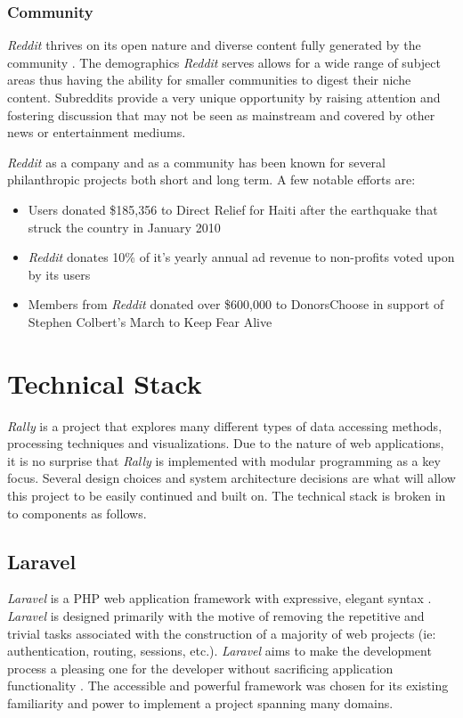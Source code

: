 \documentclass[msc,oneside]{ubcthesis}%
\begin{document}
\subsection{Community}
\textit{Reddit} thrives on its open nature and diverse content fully generated by the community \citep{Atlantic}. The demographics \textit{Reddit} serves allows for a wide range of subject areas thus having the ability for smaller communities to digest their niche content. Subreddits provide a very unique opportunity by raising attention and fostering discussion that may not be seen as mainstream and covered by other news or entertainment mediums.
\par{}
\textit{Reddit} as a company and as a community has been known for several philanthropic projects both short and long term. A few notable efforts are:
\begin{itemize}
\item{Users donated \$185,356 to Direct Relief for Haiti after the earthquake that struck the country in January 2010}
\item{\textit{Reddit} donates 10\% of it's yearly annual ad revenue to non-profits voted upon by its users \citep{RedditBlog}}
\item{Members from \textit{Reddit} donated over \$600,000 to DonorsChoose in support of Stephen Colbert's March to Keep Fear Alive \citep{DonorsChoose}}
\end{itemize}

\chapter{Technical Stack}
\textit{Rally} is a project that explores many different types of data accessing methods, processing techniques and visualizations. Due to the nature of web applications, it is no surprise that \textit{Rally} is implemented with modular programming as a key focus. Several design choices and system architecture decisions are what will allow this project to be easily continued and built on. The technical stack is broken in to components as follows.

\section{Laravel}
\textit{Laravel} is a PHP web application framework with expressive, elegant syntax \citep{Laravel}. \textit{Laravel} is designed primarily with the motive of removing the repetitive and trivial tasks associated with the construction of a majority of web projects (ie: authentication, routing, sessions, etc.). \textit{Laravel} aims to make the development process a pleasing one for the developer without sacrificing application functionality \citep{Laravel}. The accessible and powerful framework was chosen for its existing familiarity and power to implement a project spanning many domains.
\end{document}
